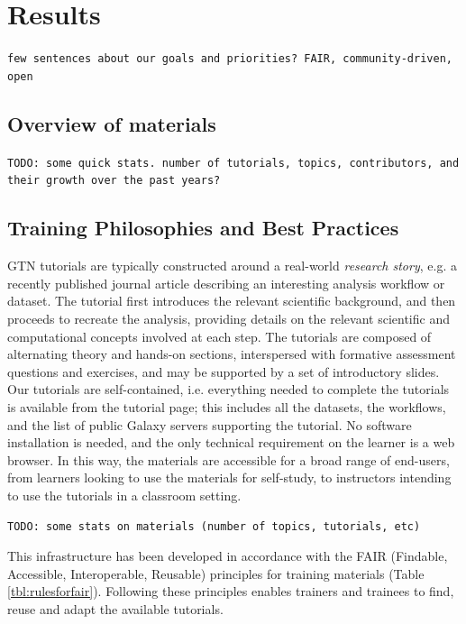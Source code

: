\documentclass[10pt,letterpaper]{article}
\begin{document}
\section*{Results}

\verb+few sentences about our goals and priorities? FAIR, community-driven, open+


\subsection*{Overview of materials}

\verb+TODO: some quick stats. number of tutorials, topics, contributors, and their growth over the past years?+



\subsection*{Training Philosophies and Best Practices}

GTN tutorials are typically constructed around a real-world \emph{research story}, e.g. a recently published journal article describing an interesting analysis workflow or dataset.
The tutorial first introduces the relevant scientific background, and then proceeds to recreate the analysis, providing details on the relevant scientific and computational concepts involved at each step.
The tutorials are composed of alternating theory and hands-on sections, interspersed with formative assessment questions and exercises, and may be supported by a set of introductory slides.
Our tutorials are self-contained, i.e. everything needed to complete the tutorials is available from the tutorial page; this includes all the datasets, the workflows, and the list of public Galaxy servers supporting the tutorial. No software installation is needed, and the only technical requirement on the learner is a web browser.
In this way, the materials are accessible for a broad range of end-users, from learners looking to use the materials for self-study, to instructors intending to use the tutorials in a classroom setting.

\verb+TODO: some stats on materials (number of topics, tutorials, etc)+


This infrastructure has been developed in accordance with the FAIR (Findable, Accessible, Interoperable, Reusable) principles for training materials \cite{Garcia2020} (Table \ref{tbl:rulesforfair}).
Following these principles enables trainers and trainees to find, reuse and adapt the available tutorials.
\end{document}
